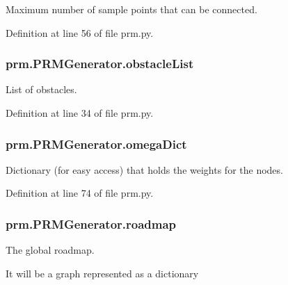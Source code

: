 Maximum number of sample points that can be connected. 



Definition at line 56 of file prm.\-py.

\hypertarget{classprm_1_1PRMGenerator_a86b5b9254eb1e5f2c79fc32775c003e2}{
\subsubsection[{obstacle\-List}]{\setlength{\rightskip}{0pt plus 5cm}prm.\-P\-R\-M\-Generator.\-obstacle\-List}}\label{classprm_1_1PRMGenerator_a86b5b9254eb1e5f2c79fc32775c003e2}


List of obstacles. 



Definition at line 34 of file prm.\-py.

\hypertarget{classprm_1_1PRMGenerator_ad56b6bb5da1e474ab8a8099863207de3}{
\subsubsection[{omega\-Dict}]{\setlength{\rightskip}{0pt plus 5cm}prm.\-P\-R\-M\-Generator.\-omega\-Dict}}\label{classprm_1_1PRMGenerator_ad56b6bb5da1e474ab8a8099863207de3}


Dictionary (for easy access) that holds the weights for the nodes. 



Definition at line 74 of file prm.\-py.

\hypertarget{classprm_1_1PRMGenerator_a7fa851696426c3e1bbd7ff737cf33538}{
\subsubsection[{roadmap}]{\setlength{\rightskip}{0pt plus 5cm}prm.\-P\-R\-M\-Generator.\-roadmap}}\label{classprm_1_1PRMGenerator_a7fa851696426c3e1bbd7ff737cf33538}


The global roadmap. 

It will be a graph represented as a dictionary 


